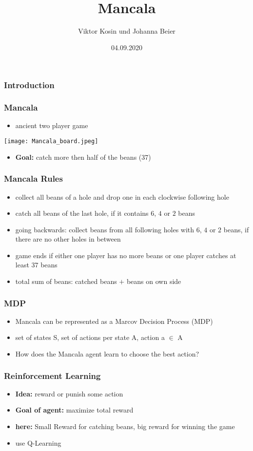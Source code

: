 \documentclass{beamer}
\title{Mancala}
\author{Viktor Kosin und Johanna Beier}
\date{04.09.2020}
\begin{document}
\frame{\titlepage}

\begin{frame}
\frametitle{Introduction}

\end{frame}

\begin{frame}
\frametitle{Mancala}
\begin{itemize}
\item ancient two player game
\end{itemize}
\texttt{[image: Mancala\_board.jpeg]}
\begin{itemize}
\item\textbf{Goal:} catch more then half of the beans (37) 
\end{itemize}
\end{frame}

\begin{frame}
\frametitle{Mancala Rules}
\begin{itemize}
\item collect all beans of a hole and drop one in each clockwise following hole
\item catch all beans of the last hole, if it contains $6$, $4$ or $2$ beans
\item going backwards: collect beans from all following holes with $6$, $4$ or $2$ beans, if there are no other holes in between
\item game ends if either one player has no more beans or one player catches at least $37$ beans
\item total sum of beans: catched beans $+$ beans on own side
\end{itemize}
\end{frame}

\begin{frame}
 \frametitle{MDP}
 \begin{itemize}
 \item Mancala can be represented as a Marcov Decision Process (MDP)
 \item set of states S, set of actions per state A, action a $\in$ A
 \item How does the Mancala agent learn to choose the best action?
 \end{itemize}
 \end{frame}

 \begin{frame}
 \frametitle{Reinforcement Learning}
 \begin{itemize}
 \item \textbf{Idea:} reward or punish some action
 \item \textbf{Goal of agent:} maximize total reward
 \item \textbf{here:} Small Reward for catching beans, big reward for winning the game
 \item use Q-Learning
 \end{itemize}
 \end{frame}
 
\end{document}
